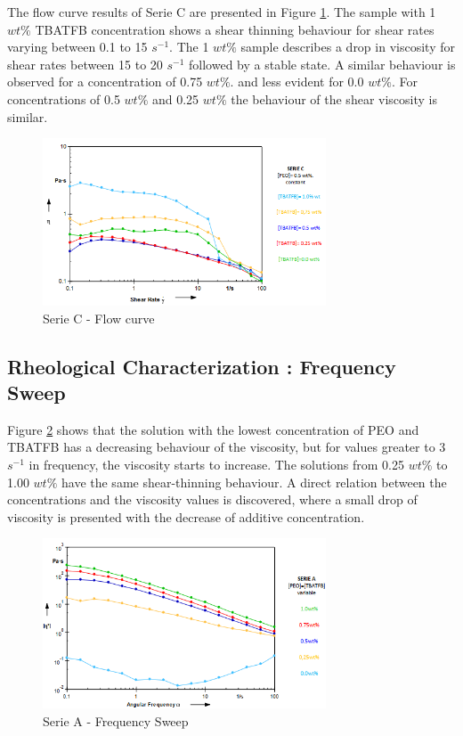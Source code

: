 The flow curve results of Serie C are presented in Figure \ref{fig:SerieCflowCurve}. The sample with 1 $w t \%$ TBATFB concentration shows a shear thinning behaviour for shear rates varying between 0.1 to 15 $s^{-1}$. The 1 $w t \%$ sample describes a drop in viscosity for shear rates between 15 to 20 $s^{-1}$ followed by a stable state. A similar behaviour is observed for a concentration of 0.75 $w t \%$. and less evident for 0.0 $w t \%$. For concentrations of 0.5 $w t \%$ and 0.25 $w t \%$ the behaviour of the shear viscosity is similar.

\begin{figure}[th]
\centering
\includegraphics[width=0.75\textwidth]{./Figures/SerieCflowCurve.png}
\decoRule
\caption[Serie C - Flow curve]{Serie C - Flow curve \cite{Flores2017}}
\label{fig:SerieCflowCurve}
\end{figure}

\subsection{Rheological Characterization : \textbf{Frequency Sweep}}
Figure \ref{fig:SerieAfreqSweep} shows that the solution with the lowest concentration of PEO and TBATFB has a decreasing behaviour of the viscosity, but for values greater to 3 $s^{-1}$ in frequency, the viscosity starts to increase. The solutions from 0.25 $w t \%$ to 1.00 $w t \%$ have the same shear-thinning behaviour. A direct relation between the concentrations and the viscosity values is discovered, where a small drop of viscosity is presented with the decrease of additive concentration.

\begin{figure}[th]
\centering
\includegraphics[width=0.75\textwidth]{./Figures/SerieAfreqSweep.png}
\decoRule
\caption[Serie A - Frequency Sweep]{Serie A - Frequency Sweep \cite{Flores2017}}
\label{fig:SerieAfreqSweep}
\end{figure}

